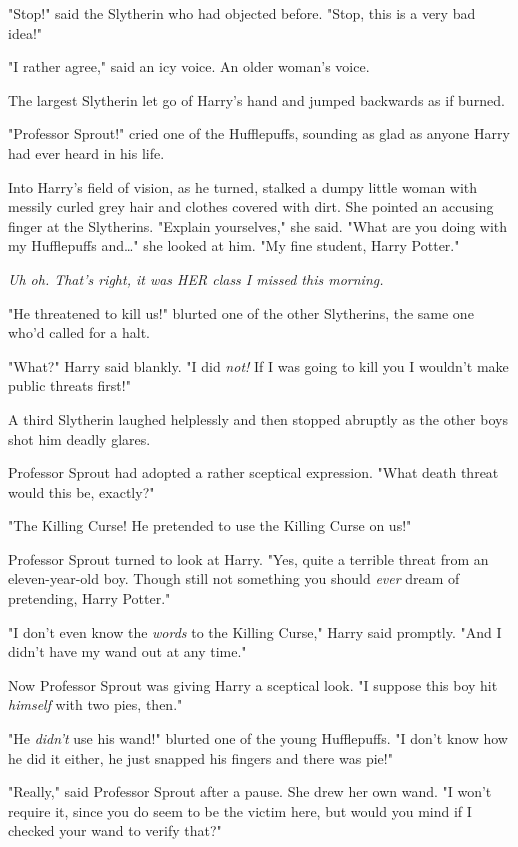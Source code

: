 "Stop!" said the Slytherin who had objected before. "Stop, this is a very bad
idea!"

"I rather agree," said an icy voice. An older woman's voice.

The largest Slytherin let go of Harry's hand and jumped backwards as if burned.

"Professor Sprout!" cried one of the Hufflepuffs, sounding as glad as anyone
Harry had ever heard in his life.

Into Harry's field of vision, as he turned, stalked a dumpy little woman with
messily curled grey hair and clothes covered with dirt. She pointed an accusing
finger at the Slytherins. "Explain yourselves," she said. "What are you doing
with my Hufflepuffs and{\ldots}" she looked at him. "My fine student, Harry
Potter."

\emph{Uh oh. That's right, it was HER class I missed this morning.}

"He threatened to kill us!" blurted one of the other Slytherins, the same one
who'd called for a halt.

"What?" Harry said blankly. "I did \emph{not!} If I was going to kill you I
wouldn't make public threats first!"

A third Slytherin laughed helplessly and then stopped abruptly as the other
boys shot him deadly glares.

Professor Sprout had adopted a rather sceptical expression. "What death threat
would this be, exactly?"

"The Killing Curse! He pretended to use the Killing Curse on us!"

Professor Sprout turned to look at Harry. "Yes, quite a terrible threat from an
eleven-year-old boy. Though still not something you should \emph{ever} dream of
pretending, Harry Potter."

"I don't even know the \emph{words} to the Killing Curse," Harry said promptly.
"And I didn't have my wand out at any time."

Now Professor Sprout was giving Harry a sceptical look. "I suppose this boy hit
\emph{himself} with two pies, then."

"He \emph{didn't} use his wand!" blurted one of the young Hufflepuffs. "I don't
know how he did it either, he just snapped his fingers and there was pie!"

"Really," said Professor Sprout after a pause. She drew her own wand. "I won't
require it, since you do seem to be the victim here, but would you mind if I
checked your wand to verify that?"

